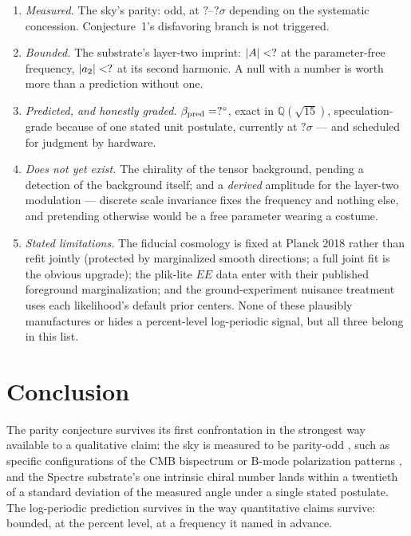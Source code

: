 \documentclass[11pt,a4paper]{article}
\newcommand{\CFBetaPull}{?}\newcommand{\CFBetaSigma}{?}
\newcommand{\CFBetaZDust}{?}\newcommand{\CFBetaZFace}{?}
\theoremstyle{plain}
\theoremstyle{definition}
\begin{document}
\begin{enumerate}[leftmargin=2em]
\item \emph{Measured.} The sky's parity: odd, at
$\CFBetaZDust$--$\CFBetaZFace\sigma$ depending on the systematic
concession. Conjecture~1's disfavoring branch is not triggered.
\item \emph{Bounded.} The substrate's layer-two imprint:
$|A|<?$ at the parameter-free frequency, $|a_{2}|<?$
at its second harmonic. A null with a number is worth more than a
prediction without one.
\item \emph{Predicted, and honestly graded.} $\beta_{\rm pred}=
?^{\circ}$, exact in $\mathbb{Q}(\sqrt{15})$, speculation-%
grade because of one stated unit postulate, currently at
$\CFBetaPull\sigma$ --- and scheduled for judgment by hardware.
\item \emph{Does not yet exist.} The chirality of the tensor
background, pending a detection of the background itself; and a
\emph{derived} amplitude for the layer-two modulation --- discrete
scale invariance fixes the frequency and nothing else, and pretending
otherwise would be a free parameter wearing a costume.
\item \emph{Stated limitations.} The fiducial cosmology is fixed at
Planck 2018 rather than refit jointly (protected by marginalized smooth
directions; a full joint fit is the obvious upgrade); the plik-lite
$EE$ data enter with their published foreground marginalization; and
the ground-experiment nuisance treatment uses each likelihood's default
prior centers. None of these plausibly manufactures or hides a
percent-level log-periodic signal, but all three belong in this list.
\end{enumerate}

\section{Conclusion}
\label{sec:conclusion}

The parity conjecture survives its first confrontation in the strongest way available to a
qualitative claim: the sky is measured to be parity-odd \cite{Shamir2025},
such as specific configurations of the CMB bispectrum or B-mode polarization patterns \cite{Eskilt2026, Kamionkowski2010, BenDavid2011, Shiraishi2014, Murai2023},
and the Spectre substrate's one intrinsic chiral
number lands within a twentieth of a standard deviation of the measured
angle under a single stated postulate. The log-periodic prediction
survives in the way quantitative claims survive: bounded, at the
percent level, at a frequency it named in advance.
\end{document}
